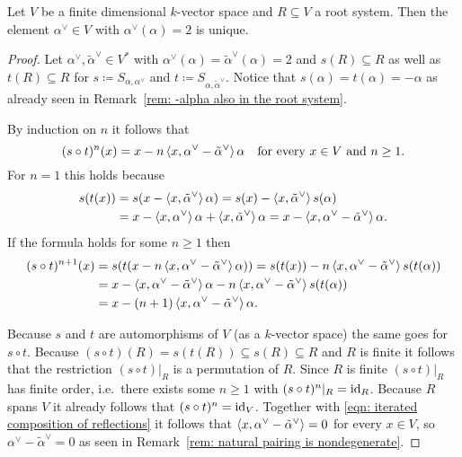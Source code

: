 \begin{lem}
 Let $V$ be a finite dimensional $k$-vector space and $R \subseteq V$ a root system. Then the element $\alpha^\vee \in V$ with $\alpha^\vee(\alpha) = 2$ is unique.
\end{lem}
\begin{proof}
 Let $\alpha^\vee, \tilde{\alpha}^\vee \in V^*$ with $\alpha^\vee(\alpha) = \tilde{\alpha}^\vee(\alpha) = 2$ and $s(R) \subseteq R$ as well as $t(R) \subseteq R$ for $s \coloneqq S_{\alpha, \alpha^\vee}$ and $t \coloneqq S_{\alpha, \tilde{\alpha}^\vee}$. Notice that $s(\alpha) = t(\alpha) = -\alpha$ as already seen in Remark~\ref{rem: -alpha also in the root system}.
 
 By induction on $n$ it follows that
 \begin{equation}\label{eqn: iterated composition of reflections}
  (s \circ t)^n(x) =  x - n\left\langle x,\alpha^\vee - \tilde{\alpha}^\vee\right\rangle \alpha
  \quad \text{for every $x \in V$ and $n \geq 1$}.
 \end{equation}
 For $n = 1$ this holds because
 \begin{align*}
  s(t(x))
  &= s(x - \left\langle x, \tilde{\alpha}^\vee\right\rangle\alpha)
  = s(x) - \left\langle x, \tilde{\alpha}^\vee\right\rangle s(\alpha) \\
  &= x - \left\langle x, \alpha^\vee\right\rangle\alpha + \left\langle x, \tilde{\alpha}^\vee\right\rangle\alpha
  = x - \left\langle x, \alpha^\vee - \tilde{\alpha}^\vee\right\rangle \alpha.
 \end{align*}
 If the formula holds for some $n \geq 1$ then
 \begin{align*}
  (s \circ t)^{n+1}(x)
  &= s(t(x - n\left\langle x,\alpha^\vee - \tilde{\alpha}^\vee\right\rangle \alpha))
  = s(t(x)) - n\left\langle x,\alpha^\vee - \tilde{\alpha}^\vee\right\rangle s(t(\alpha)) \\
  &= x - \left\langle x, \alpha^\vee - \tilde{\alpha}^\vee\right\rangle \alpha - n\left\langle x,\alpha^\vee - \tilde{\alpha}^\vee\right\rangle s(t(\alpha)) \\
  &= x - (n+1)\left\langle x, \alpha^\vee - \tilde{\alpha}^\vee\right\rangle \alpha.
 \end{align*}
 
 Because $s$ and $t$ are automorphisms of $V$ (as a $k$-vector space) the same goes for $s \circ t$. Because $(s \circ t)(R) = s(t(R)) \subseteq s(R) \subseteq R$ and $R$ is finite it follows that the restriction $(s \circ t)|_R$ is a permutation of $R$. Since $R$ is finite $(s \circ t)|_R$ has finite order, i.e.\ there exists some $n \geq 1$ with $(s \circ t)^n|_R = \operatorname{id}_R$. Because $R$ spans $V$ it already follows that $(s \circ t)^n = \operatorname{id}_V$. Together with \eqref{eqn: iterated composition of reflections} it follows that $\left\langle x, \alpha^\vee - \tilde{\alpha}^\vee\right\rangle = 0$ for every $x \in V$, so $\alpha^\vee - \tilde{\alpha}^\vee = 0$ as seen in Remark~\ref{rem: natural pairing is nondegenerate}.
\end{proof}


















